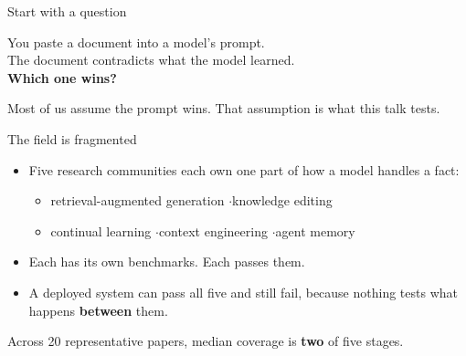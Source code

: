 \documentclass[aspectratio=169]{beamer}
\begin{document}
\begin{frame}{Start with a question}
  \vspace{0.5cm}
  \begin{center}
    {\Large You paste a document into a model's prompt.}\\[6mm]
    {\Large The document contradicts what the model learned.}\\[9mm]
    {\LARGE\bfseries\color{acquire} Which one wins?}
  \end{center}
  \vspace{0.6cm}
  \begin{center}\color{muted}\small
    Most of us assume the prompt wins. That assumption is what this talk tests.
  \end{center}
\end{frame}

\begin{frame}{The field is fragmented}
  \begin{itemize}\setlength\itemsep{1.0em}
    \item Five research communities each own one part of how a model handles a fact:
      \begin{itemize}\setlength\itemsep{0.25em}
        \item retrieval-augmented generation \quad$\cdot$\quad knowledge editing
        \item continual learning \quad$\cdot$\quad context engineering \quad$\cdot$\quad agent memory
      \end{itemize}
    \item Each has its own benchmarks. Each passes them.
    \item A deployed system can pass all five and still fail, because nothing tests
          what happens \textbf{between} them.
  \end{itemize}
  \vspace{0.8em}
  \begin{center}
    \color{muted}Across 20 representative papers, median coverage is \textbf{two} of five stages.
  \end{center}
\end{frame}
\end{document}
